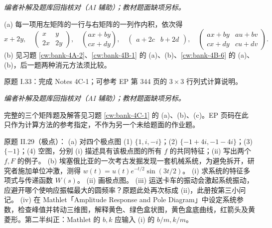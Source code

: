 \begin{solution}
\textit{编者补解及题库回指核对（AI 辅助）；教材题面缺项另标。}\par

(a) 每一项用左矩阵的一行与右矩阵的一列作内积，依次得
\[x+2y,\quad \begin{pmatrix}x&y\\2x&2y\end{pmatrix},\quad\binom{ax+by}{cx+dy},\quad\begin{pmatrix}a+2c&b+2d\end{pmatrix},\quad\begin{pmatrix}ax+by&au+bv\\cx+dy&cu+dv\end{pmatrix}.\]
(b) 见习题 \ref{cw:bank-4A-2}、\ref{cw:bank-4B-1} 的 (a)、(b)、\ref{cw:bank-4B-6} 的 (a)、(b)，后一题两种消元方法须比较。
\end{solution}
\begin{exercise}\label{cw:ps8-I-33}原题 I.33：完成 Notes 4C-1；可参考 EP 第 344 页的 $3\times3$ 行列式计算说明。\end{exercise}
\begin{solution}
\textit{编者补解及题库回指核对（AI 辅助）；教材题面缺项另标。}\par
完整的三个矩阵题及解答见习题 \ref{cw:bank-4C-1} 的 (a)、(b)、(c)。EP 页码在此只作为计算方法的参考指定，不作为另一个未给题面的作业题。\end{solution}
\begin{exercise}\label{cw:ps8-II-29}原题 II.29（极点）：
(a) 对四个极点图 (1) $\{1,i,-i\}$；(2) $\{-1+4i,-1-4i\}$；(3) $\{-1\}$；(4) 空图，分别 (i) 描述具有该极点图的所有 $f$ 的共同特征；(ii) 写出两个 $f,F$ 的例子。
(b) 埃塞俄比亚的一次考古发掘发现一套机械系统，为避免拆开，研究者施加单位冲激，测得 $w(t)=u(t)e^{-t/2}\sin(3t/2)$。
(i) 求系统的特征多项式与传递函数 $W(s)$。
(ii) 画极点图。
(iii) 运送卡车的振动会激起系统振动，应避开哪个使响应振幅最大的圆频率？原题此处再次标成 (ii)，此册按第三小问记。
(iv) 在 Mathlet「Amplitude Response and Pole Diagram」中设定系统参数，检查峰值并转动三维图，解释黄色、绿色盒状图，黄色盒底曲线，红箭头及黄菱形。第二半纠正：Mathlet 的 $b,k$ 应输入 (i) 的 $b/m,k/m$。\end{exercise}
